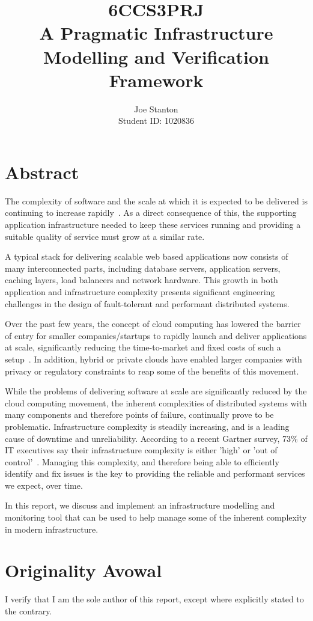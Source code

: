 \documentclass{cshonours}
\title{6CCS3PRJ \\\vspace{0.5cm}
  A Pragmatic Infrastructure Modelling and Verification Framework}
\author{Joe Stanton\\\vspace{0.5cm}
  Student ID: 1020836
}
\begin{document}
\maketitle

\chapter*{Abstract}
The complexity of software and the scale at which it is expected to be delivered is continuing to increase rapidly~\cite{SoftwareComplexity}.
As a direct consequence of this, the supporting application infrastructure needed to keep these services running and providing a suitable quality of service must grow at a similar rate.

A typical stack for delivering scalable web based applications now consists of many interconnected parts, including database servers, application servers, caching layers, load balancers and network hardware.
This growth in both application and infrastructure complexity presents significant engineering challenges in the design of fault-tolerant and performant distributed systems.

Over the past few years, the concept of cloud computing has lowered the barrier of entry for smaller companies/startups to rapidly launch and deliver applications at scale, significantly reducing the time-to-market and fixed costs of such a setup~\cite{CloudComputing}.
In addition, hybrid or private clouds have enabled larger companies with privacy or regulatory constraints to reap some of the benefits of this movement.

While the problems of delivering software at scale are significantly reduced by the cloud computing movement, the inherent complexities of distributed systems with many components and therefore points of failure, continually prove to be problematic. Infrastructure complexity is steadily increasing, and is a leading cause of downtime and unreliability. According to a recent Gartner survey, 73\% of IT executives say their infrastructure complexity is either 'high' or 'out of control'~\cite{Gartner2013}. Managing this complexity, and therefore being able to efficiently identify and fix issues is the key to providing the reliable and performant services we expect, over time.

In this report, we discuss and implement an infrastructure modelling and monitoring tool that can be used to help manage some of the inherent complexity in modern infrastructure.

\chapter*{Originality Avowal}
I verify that I am the sole author of this report, except where explicitly stated to the contrary. 
\end{document}
